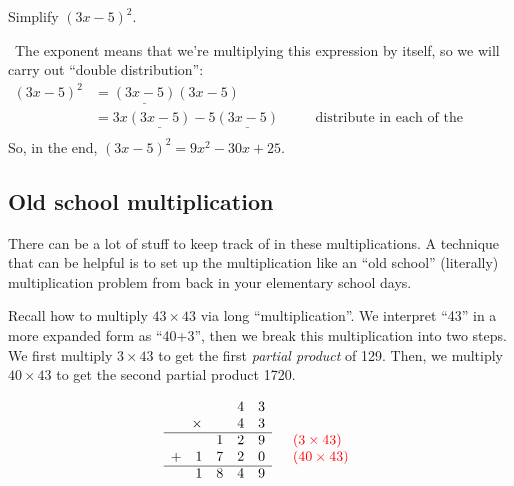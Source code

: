 \begin{boxex}
Simplify $(3x-5)^2$.

\exsoln\ The exponent means that we're multiplying this expression by itself, so we will carry out ``double distribution'':
\[\begin{aligned}
(3x-5)^2
&= \underline{(3x-5)}(3x-5)
\\
&= 3x\underline{(3x-5)} - 5\underline{(3x-5)}
&& \quad\text{distribute in each of the resulting expressions}
\\
\end{aligned}\]
So, in the end, $(3x-5)^2 = 9x^2 - 30x + 25$.
\end{boxex}

\subsection{Old school multiplication}

There can be a lot of stuff to keep track of in these multiplications. A technique that can be helpful is to set up the multiplication like an ``old school'' (literally) multiplication problem from back in your elementary school days.

Recall how to multiply $43 \times 43$ via long ``multiplication''. We interpret ``43'' in a more expanded form as ``40+3'', then we break this multiplication into two steps. We first multiply $3\times43$ to get the first \textit{partial product} of 129. Then, we multiply $40\times43$ to get the second partial product 1720.

\[\begin{array}{rcccl}
		&	& 4	& 3&\\
\times	&	& 4	& 3&\\
\cline{1-4}
			& 1	& 2	& 9&\quad{\color{red}(3\times43)}\\
+\quad1	& 7	& 2	& 0&\quad{\color{red}(40\times43)}\\
\cline{1-4}
1 & 8 & 4 & 9&
\end{array}\]


